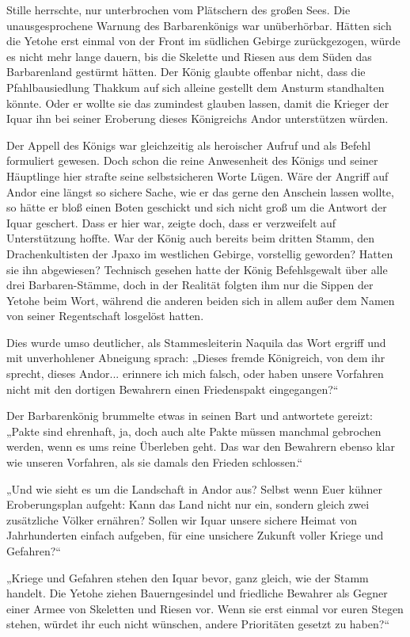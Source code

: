 Stille herrschte, nur unterbrochen vom Plätschern des großen Sees. Die unausgesprochene Warnung des Barbarenkönigs war unüberhörbar. Hätten sich die Yetohe erst einmal von der Front im südlichen Gebirge zurückgezogen, würde es nicht mehr lange dauern, bis die Skelette und Riesen aus dem Süden das Barbarenland gestürmt hätten. Der König glaubte offenbar nicht, dass die Pfahlbausiedlung Thakkum auf sich alleine gestellt dem Ansturm standhalten könnte. Oder er wollte sie das zumindest glauben lassen, damit die Krieger der Iquar ihn bei seiner Eroberung dieses Königreichs Andor unterstützen würden.

Der Appell des Königs war gleichzeitig als heroischer Aufruf und als Befehl formuliert gewesen. Doch schon die reine Anwesenheit des Königs und seiner Häuptlinge hier strafte seine selbstsicheren Worte Lügen. Wäre der Angriff auf Andor eine längst so sichere Sache, wie er das gerne den Anschein lassen wollte, so hätte er bloß einen Boten geschickt und sich nicht groß um die Antwort der Iquar geschert. Dass er hier war, zeigte doch, dass er verzweifelt auf Unterstützung hoffte. War der König auch bereits beim dritten Stamm, den Drachenkultisten der Jpaxo im westlichen Gebirge, vorstellig geworden? Hatten sie ihn abgewiesen? Technisch gesehen hatte der König Befehlsgewalt über alle drei Barbaren-Stämme, doch in der Realität folgten ihm nur die Sippen der Yetohe beim Wort, während die anderen beiden sich in allem außer dem Namen von seiner Regentschaft losgelöst hatten.

Dies wurde umso deutlicher, als Stammesleiterin Naquila das Wort ergriff und mit unverhohlener Abneigung sprach: „Dieses fremde Königreich, von dem ihr sprecht, dieses Andor... erinnere ich mich falsch, oder haben unsere Vorfahren nicht mit den dortigen Bewahrern einen Friedenspakt eingegangen?“

Der Barbarenkönig brummelte etwas in seinen Bart und antwortete gereizt: „Pakte sind ehrenhaft, ja, doch auch alte Pakte müssen manchmal gebrochen werden, wenn es ums reine Überleben geht. Das war den Bewahrern ebenso klar wie unseren Vorfahren, als sie damals den Frieden schlossen.“

„Und wie sieht es um die Landschaft in Andor aus? Selbst wenn Euer kühner Eroberungsplan aufgeht: Kann das Land nicht nur ein, sondern gleich zwei zusätzliche Völker ernähren? Sollen wir Iquar unsere sichere Heimat von Jahrhunderten einfach aufgeben, für eine unsichere Zukunft voller Kriege und Gefahren?“

„Kriege und Gefahren stehen den Iquar bevor, ganz gleich, wie der Stamm handelt. Die Yetohe ziehen Bauerngesindel und friedliche Bewahrer als Gegner einer Armee von Skeletten und Riesen vor. Wenn sie erst einmal vor euren Stegen stehen, würdet ihr euch nicht wünschen, andere Prioritäten gesetzt zu haben?“

